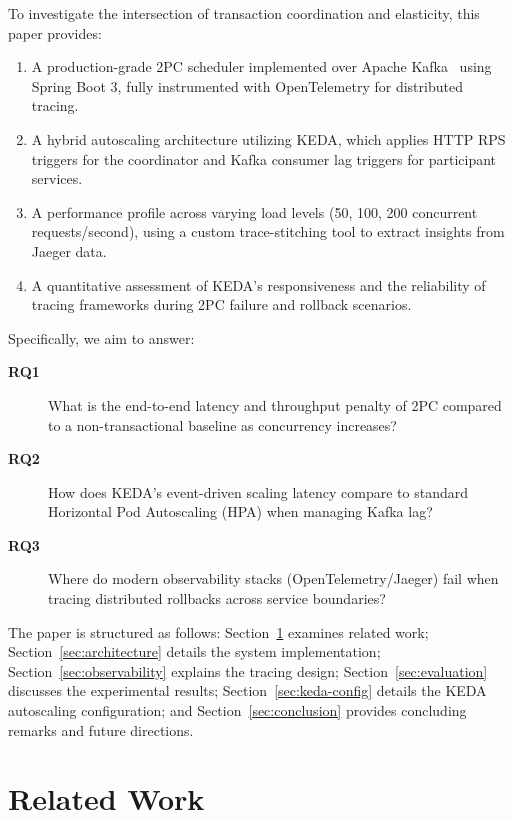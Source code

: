 \documentclass[]{USG}
\begin{document}
To investigate the intersection of transaction coordination and elasticity, this paper provides:
\begin{enumerate}
  \item A production-grade 2PC scheduler implemented over Apache Kafka~\cite{kafka2011} using Spring Boot 3, fully instrumented with OpenTelemetry for distributed tracing.
  \item A hybrid autoscaling architecture utilizing KEDA, which applies HTTP RPS triggers for the coordinator and Kafka consumer lag triggers for participant services.
  \item A performance profile across varying load levels ({50, 100, 200} concurrent requests/second), using a custom trace-stitching tool to extract insights from Jaeger data.
  \item A quantitative assessment of KEDA's responsiveness and the reliability of tracing frameworks during 2PC failure and rollback scenarios.
\end{enumerate}

Specifically, we aim to answer:
\begin{description}
  \item[\textbf{RQ1}] What is the end-to-end latency and throughput penalty of 2PC compared to a non-transactional baseline as concurrency increases?
  \item[\textbf{RQ2}] How does KEDA’s event-driven scaling latency compare to standard Horizontal Pod Autoscaling (HPA) when managing Kafka lag?
  \item[\textbf{RQ3}] Where do modern observability stacks (OpenTelemetry/Jaeger) fail when tracing distributed rollbacks across service boundaries?
\end{description}

The paper is structured as follows:
Section~\ref{sec:related-work} examines related work;
Section~\ref{sec:architecture} details the system implementation;
Section~\ref{sec:observability} explains the tracing design;
Section~\ref{sec:evaluation} discusses the experimental results;
Section~\ref{sec:keda-config} details the KEDA autoscaling configuration; and 
Section~\ref{sec:conclusion} provides concluding remarks and future directions.


\section{Related Work}
\label{sec:related-work}
\end{document}
